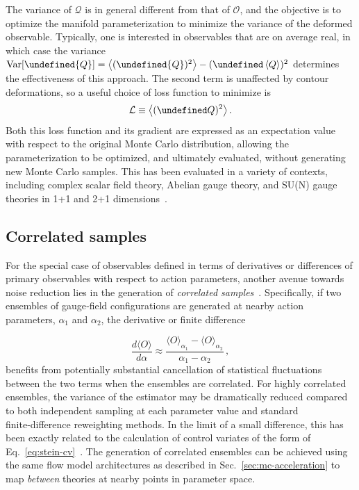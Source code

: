 \documentclass[12pt]{article}
\let\Re\undefined
\DeclareMathOperator{\Re}{Re}
\begin{document}
The variance of $\mathcal{Q}$ is in general different from that of $\mathcal{O}$, and the objective is to optimize the manifold parameterization to minimize the variance of the deformed observable. Typically, one is interested in observables that are on average real, in which case the variance $\mathrm{Var}[\Re{Q}] = \left< (\Re{Q})^2 \right> - (\Re\left<Q\right>)^2$ determines the effectiveness of this approach. The second term is unaffected by contour deformations, so a useful choice of loss function to minimize is
\begin{equation} \label{eq:loss-fn}
    \mathcal{L} \equiv \left< (\Re Q)^2 \right>. %
\end{equation}
Both this loss function and its gradient are expressed as an expectation value with respect to the original Monte Carlo distribution, allowing the parameterization to be optimized, and ultimately evaluated, without generating new Monte Carlo samples.
This has been evaluated in a variety of contexts, including complex scalar field theory, Abelian gauge theory, and SU(N) gauge theories in 1+1 and 2+1 dimensions~\cite{Detmold:2020ncp,Detmold:2021ulb,Detmold:2023kjm}.



\subsection{Correlated samples}

For the special case of observables defined in terms of derivatives or differences of primary observables with respect to action parameters, another avenue towards noise reduction lies in the generation of {\it correlated samples}~\cite{Abbott:2024kfc}. Specifically, if two ensembles of gauge‑field configurations are generated at nearby action parameters, $\alpha_1$ and $\alpha_2$, the derivative or finite difference
%

\begin{equation}
\frac{d\langle O\rangle}{d\alpha} \approx \frac{\langle O\rangle_{\alpha_1} - \langle O\rangle_{\alpha_2}}{\alpha_1 - \alpha_2}\,,
\end{equation}
%
benefits from potentially substantial cancellation of statistical fluctuations between the two terms when the ensembles are correlated. For highly correlated ensembles, the variance of the estimator may be dramatically reduced compared to both independent sampling at each parameter value and standard finite‑difference reweighting methods. In the limit of a small difference, this has been exactly related to the calculation of control variates of the form of Eq.~\eqref{eq:stein-cv}~\cite{Abbott:2026ylv,Abbott:2026vui,Butti:2026gwi}.
%
The generation of correlated ensembles can be achieved using the same flow model architectures as described in Sec.~\ref{sec:mc-acceleration} to map \emph{between} theories at nearby points in parameter space.
\end{document}
